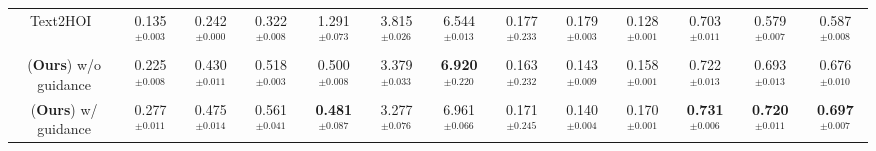\begin{table}
{\begin{tabular}{@{}ccccccccccccc@{}}
        Text2HOI~\cite{cha2024text2hoi} &
       0.135$^{\pm0.003}$ & 0.242$^{\pm0.000}$ & 0.322$^{\pm0.008}$ & 1.291$^{\pm0.073}$ & 3.815$^{\pm0.026}$ & 6.544$^{\pm0.013}$ & 0.177$^{\pm0.233}$ & 0.179$^{\pm0.003}$ & 0.128$^{\pm0.001}$ & 0.703$^{\pm0.011}$ & 0.579$^{\pm0.007}$ & 0.587$^{\pm0.008}$\\
        
        \ours{}(\textbf{Ours}) w/o guidance &
       0.225$^{\pm0.008}$ & 0.430$^{\pm0.011}$ & 0.518$^{\pm0.003}$ & 0.500$^{\pm0.008}$ & 3.379$^{\pm0.033}$ & \textbf{6.920}$^{\pm0.220}$ & 0.163$^{\pm0.232}$ & 0.143$^{\pm0.009}$ & 0.158$^{\pm0.001}$ & 0.722$^{\pm0.013}$ & 0.693$^{\pm0.013}$ & 0.676$^{\pm0.010}$\\
        
        \ours{}(\textbf{Ours}) w/ guidance &
        0.277$^{\pm0.011}$ & 0.475$^{\pm0.014}$ & 0.561$^{\pm0.041}$ & \textbf{0.481}$^{\pm0.087}$ & 3.277$^{\pm0.076}$ & 6.961$^{\pm0.066}$ & 0.171$^{\pm0.245}$ & 0.140$^{\pm0.004}$ & 0.170$^{\pm0.001}$ & \textbf{0.731}$^{\pm0.006}$ & \textbf{0.720}$^{\pm0.011}$ & \textbf{0.697}$^{\pm0.007}$\\
        \bottomrule
    \end{tabular}}%
\end{table}

